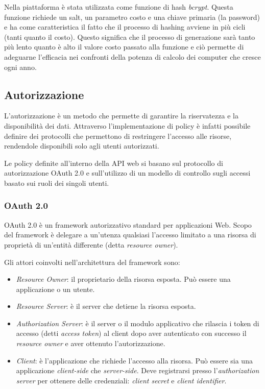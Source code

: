 Nella piattaforma è stata utilizzata come funzione di hash \textit{bcrypt}\cite{bcrypt}. Questa funzione richiede un salt, un parametro costo e una chiave primaria (la password) e ha come
caratteristica il fatto che il processo di hashing avviene in più cicli (tanti quanto il costo). Questo significa che il processo di generazione sarà tanto più lento quanto è alto il valore
costo passato alla funzione e ciò permette di adeguarne l'efficacia nei confronti della potenza di calcolo dei computer che cresce ogni anno.

\subsection{Autorizzazione}
L'autorizzazione è un metodo che permette di garantire la riservatezza e la disponibilità dei dati.
Attraverso l'implementazione di policy è infatti possibile definire dei protocolli che permettono di restringere l'accesso alle risorse,
rendendole disponibili solo agli utenti autorizzati.

Le policy definite all'interno della API web si basano sul protocollo di autorizzazione OAuth 2.0 \cite{rfc6749} e sull'utilizzo di un
modello di controllo sugli accessi basato sui ruoli dei singoli utenti.

\subsubsection{OAuth 2.0}
OAuth 2.0 è un framework autorizzativo standard per applicazioni Web.
Scopo del framework è delegare a un'utenza qualsiasi l'accesso limitato a una risorsa di proprietà di un'entità differente (detta \textit{resource owner}).

Gli attori coinvolti nell'architettura del framework sono:
\begin{itemize}
    \itemsep0em
    \item \textit{Resource Owner}: il proprietario della risorsa esposta. Può essere una applicazione o un utente.
    \item \textit{Resource Server}: è il server che detiene la risorsa esposta.
    \item \textit{Authorization Server}: è il server o il modulo applicativo che rilascia i token di accesso (detti \textit{access token}) al client dopo aver
          autenticato con successo il \textit{resource owner} e aver ottenuto l'autorizzazione.
    \item  \textit{Client}: è l'applicazione che richiede l'accesso alla risorsa. Può essere sia una applicazione \textit{client-side} che \textit{server-side}.
          Deve registrarsi presso l'\textit{authorization server} per ottenere delle credenziali: \textit{client secret} e \textit{client identifier}.
\end{itemize}

